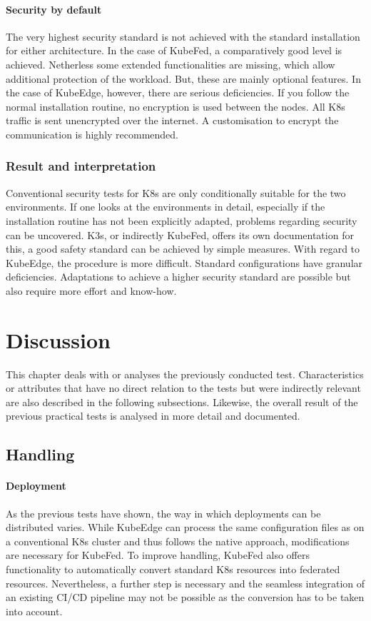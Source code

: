 \documentclass[MIC,Master,english]{twbook}%
\begin{document}
\paragraph{Security by default} The very highest security standard is not achieved with the standard installation for either architecture. In the case of KubeFed, a comparatively good level is achieved. Netherless some extended functionalities are missing, which allow additional protection of the workload. But, these are mainly optional features. In the case of KubeEdge, however, there are serious deficiencies. If you follow the normal installation routine, no encryption is used between the nodes. All \ac{K8s} traffic is sent unencrypted over the internet. A customisation to encrypt the communication is highly recommended.

\subsubsection{Result and interpretation} Conventional security tests for \ac{K8s} are only conditionally suitable for the two environments. If one looks at the environments in detail, especially if the installation routine has not been explicitly adapted, problems regarding security can be uncovered. K3s, or indirectly KubeFed, offers its own documentation for this, a good safety standard can be achieved by simple measures. With regard to KubeEdge, the procedure is more difficult. Standard configurations have granular deficiencies. Adaptations to achieve a higher security standard are possible but also require more effort and know-how.

\section{Discussion}
\label{sec:dsranalysis}
This chapter deals with or analyses the previously conducted test. Characteristics or attributes that have no direct relation to the tests but were indirectly relevant are also described in the following subsections. Likewise, the overall result of the previous practical tests is analysed in more detail and documented.

\subsection{Handling}
\label{sec:handling}
\paragraph{Deployment} As the previous tests have shown, the way in which deployments can be distributed varies. While KubeEdge can process the same configuration files as on a conventional \ac{K8s} cluster and thus follows the native approach, modifications are necessary for KubeFed. To improve handling, KubeFed also offers functionality to automatically convert standard \ac{K8s} resources into federated resources. Nevertheless, a further step is necessary and the seamless integration of an existing CI/CD pipeline may not be possible as the conversion has to be taken into account.
\end{document}
